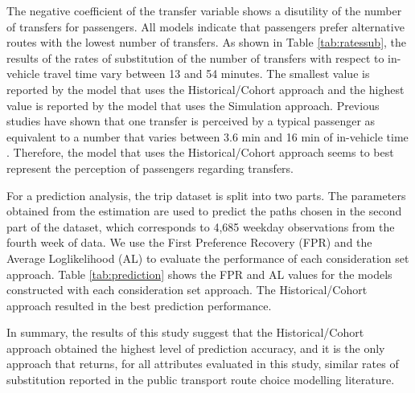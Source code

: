 \documentclass[12pt,a4paper]{article}
\begin{document}
The negative coefficient of the transfer variable shows a disutility of the number of transfers for passengers. All models indicate that passengers prefer alternative routes with the lowest number of transfers. As shown in Table \ref{tab:ratessub}, the results of the rates of substitution of the number of transfers with respect to in-vehicle travel time vary between 13 and 54 minutes. The smallest value is reported by the model that uses the Historical/Cohort approach and the highest value is reported by the model that uses the Simulation approach. Previous studies have shown that one transfer is perceived by a typical passenger as equivalent to a number that varies between 3.6 min and 16 min of in-vehicle time \citep{guo2011assessing, nassir2018strategy, raveau2014analyzing, rui2016modeling}. Therefore, the model that uses the Historical/Cohort approach seems to best represent the perception of passengers regarding transfers.

For a prediction analysis, the trip dataset is split into two parts. The parameters obtained from the estimation are used to predict the paths chosen in the second part of the dataset, which corresponds to 4,685 weekday observations from the fourth week of data. We use the First Preference Recovery (FPR) and the Average Loglikelihood (AL) to evaluate the performance of each consideration set approach. Table \ref{tab:prediction} shows the FPR and AL values for the models constructed with each consideration set approach. The Historical/Cohort approach resulted in the best prediction performance.

In summary, the results of this study suggest that the Historical/Cohort approach obtained the highest level of prediction accuracy, and it is the only approach that returns, for all attributes evaluated in this study, similar rates of substitution reported in the public transport route choice modelling literature.
\end{document}
